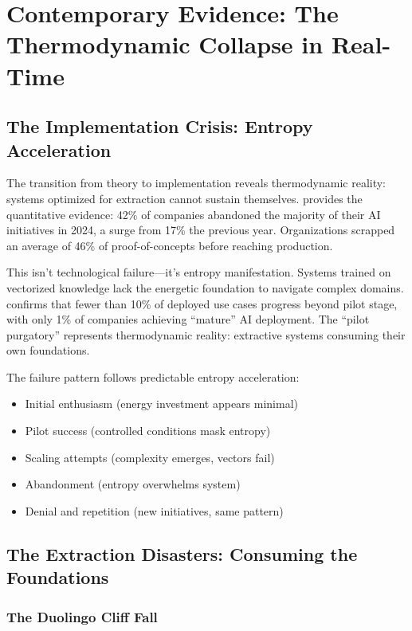 \section{Contemporary Evidence: The Thermodynamic Collapse in Real-Time}

\subsection{The Implementation Crisis: Entropy Acceleration}

The transition from theory to implementation reveals thermodynamic reality: systems optimized for extraction cannot sustain themselves. \citet{spglobal2025} provides the quantitative evidence: 42\% of companies abandoned the majority of their AI initiatives in 2024, a surge from 17\% the previous year. Organizations scrapped an average of 46\% of proof-of-concepts before reaching production.

This isn't technological failure---it's entropy manifestation. Systems trained on vectorized knowledge lack the energetic foundation to navigate complex domains. \citet{mckinsey2025} confirms that fewer than 10\% of deployed use cases progress beyond pilot stage, with only 1\% of companies achieving ``mature'' AI deployment. The ``pilot purgatory'' represents thermodynamic reality: extractive systems consuming their own foundations.

The failure pattern follows predictable entropy acceleration:
\begin{itemize}
\item Initial enthusiasm (energy investment appears minimal)
\item Pilot success (controlled conditions mask entropy)
\item Scaling attempts (complexity emerges, vectors fail)
\item Abandonment (entropy overwhelms system)
\item Denial and repetition (new initiatives, same pattern)
\end{itemize}

\subsection{The Extraction Disasters: Consuming the Foundations}

\subsubsection{The Duolingo Cliff Fall}

